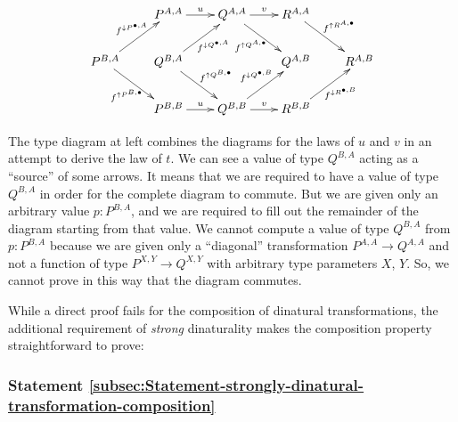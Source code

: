 \begin{wrapfigure}{l}{0.5\columnwidth}%
\vspace{-1.4\baselineskip}
\[
\xymatrix{\xyScaleY{1.8pc}\xyScaleX{1.8pc} & P^{A,A}\ar[r]\sp(0.5){u} & Q^{A,A}\ar[r]\sp(0.5){v}\ar[rd]\sb(0.45){f^{\uparrow Q^{A,\bullet}}\negthickspace\negthickspace} & R^{A,A}\ar[rd]\sp(0.45){f^{\uparrow R^{A,\bullet}}}\\
P^{B,A}\ar[ru]\sp(0.5){f^{\downarrow P^{\bullet,A}}\negthickspace\negthickspace\negthickspace\negthickspace}\ar[rd]\sb(0.5){f^{\uparrow P^{B,\bullet}}\negthickspace\negthickspace} & Q^{B,A}\ar[ru]\sb(0.55){\negthickspace\negthickspace f^{\downarrow Q^{\bullet,A}}}\ar[rd]\sp(0.5){f^{\uparrow Q^{B,\bullet}}\negthickspace\negthickspace} &  & Q^{A,B} & R^{A,B}\\
 & P^{B,B}\ar[r]\sp(0.5){u} & Q^{B,B}\ar[r]\sp(0.5){v}\ar[ru]\sp(0.5){f^{\downarrow Q^{\bullet,B}}\negthickspace\negthickspace\negthickspace} & R^{B,B}\ar[ru]\sb(0.55){\negthickspace\negthickspace f^{\downarrow R^{\bullet,B}}}
}
\]
\vspace{-1.4\baselineskip}
\end{wrapfigure}%

\noindent The type diagram at left combines the diagrams for the laws
of $u$ and $v$ in an attempt to derive the law of $t$. We can see
a value of type $Q^{B,A}$ acting as a \textsf{``}source\textsf{''} of some arrows.
It means that we are required to have a value of type $Q^{B,A}$ in
order for the complete diagram to commute. But we are given only an
arbitrary value $p:P^{B,A}$, and we are required to fill out the
remainder of the diagram starting from that value. We cannot compute
a value of type $Q^{B,A}$ from $p:P^{B,A}$ because we are given
only a \textsf{``}diagonal\textsf{''} transformation $P^{A,A}\rightarrow Q^{A,A}$
and not a function of type $P^{X,Y}\rightarrow Q^{X,Y}$ with arbitrary
type parameters $X$, $Y$. So, we cannot prove in this way that the
diagram commutes. 

While a direct proof fails for the composition of dinatural transformations,
the additional requirement of \emph{strong} dinaturality makes the
composition property straightforward to prove:

\subsubsection{Statement \label{subsec:Statement-strongly-dinatural-transformation-composition}\ref{subsec:Statement-strongly-dinatural-transformation-composition}}

